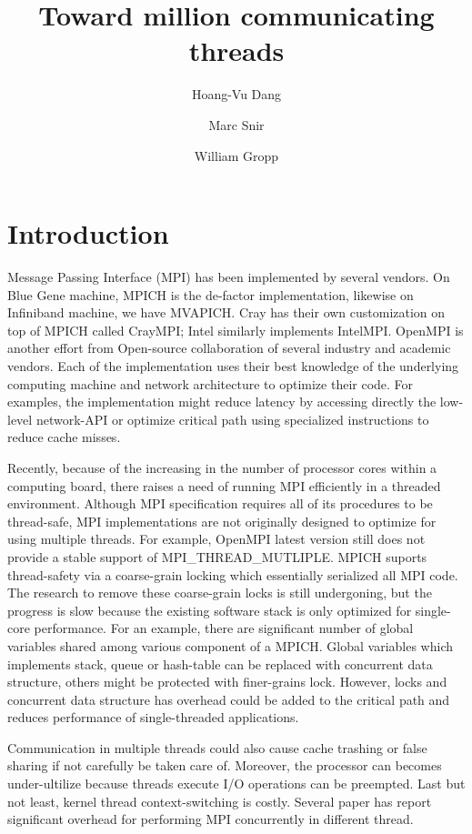 \documentclass[11pt]{article}
\title{Toward million communicating threads}
\author{Hoang-Vu Dang \and Marc Snir \and William Gropp}
\begin{document}
\maketitle


\section{Introduction}
Message Passing Interface (MPI) has been implemented by several vendors. On
Blue Gene machine, MPICH is the de-factor implementation, likewise on
Infiniband machine, we have MVAPICH. Cray has their own customization on top of
MPICH called CrayMPI; Intel similarly implements IntelMPI. OpenMPI is another
effort from Open-source collaboration of several industry and academic vendors.
Each of the implementation uses their best knowledge of the underlying
computing machine and network architecture to optimize their code. For
examples, the implementation might reduce latency by accessing directly the
low-level network-API or optimize critical path using specialized instructions
to reduce cache misses.

Recently, because of the increasing in the number of processor cores within a
computing board, there raises a need of running MPI efficiently in a threaded
environment.  Although MPI specification requires all of its procedures to be
thread-safe, MPI implementations are not originally designed to optimize for
using multiple threads. For example, OpenMPI latest version still does not
provide a stable support of MPI\_THREAD\_MUTLIPLE.  MPICH suports thread-safety
via a coarse-grain locking which essentially serialized all MPI code. The
research to remove these coarse-grain locks is still undergoning, but the
progress is slow because the existing software stack is only optimized for
single-core performance. For an example, there are significant number of global
variables shared among various component of a MPICH. Global variables which
implements stack, queue or hash-table can be replaced with concurrent data
structure, others might be protected with finer-grains lock.  However, locks
and concurrent data structure has overhead could be added to  the critical path
and reduces performance of single-threaded applications.

Communication in multiple threads could also cause cache trashing or false
sharing if not carefully be taken care of. Moreover, the processor can becomes
under-ultilize because threads execute I/O operations can be preempted. Last but
not least, kernel thread context-switching is costly. Several paper has report
significant overhead for performing MPI concurrently in different thread.
\end{document}
